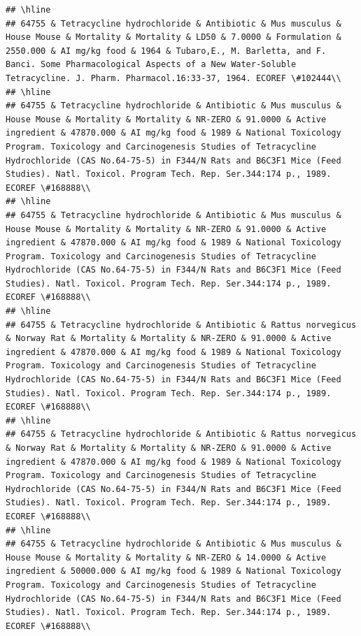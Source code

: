 \documentclass[12pt,]{article}
\begin{document}
\begin{verbatim}
## \hline
## 64755 & Tetracycline hydrochloride & Antibiotic & Mus musculus & House Mouse & Mortality & Mortality & LD50 & 7.0000 & Formulation & 2550.000 & AI mg/kg food & 1964 & Tubaro,E., M. Barletta, and F. Banci. Some Pharmacological Aspects of a New Water-Soluble Tetracycline. J. Pharm. Pharmacol.16:33-37, 1964. ECOREF \#102444\\
## \hline
## 64755 & Tetracycline hydrochloride & Antibiotic & Mus musculus & House Mouse & Mortality & Mortality & NR-ZERO & 91.0000 & Active ingredient & 47870.000 & AI mg/kg food & 1989 & National Toxicology Program. Toxicology and Carcinogenesis Studies of Tetracycline Hydrochloride (CAS No.64-75-5) in F344/N Rats and B6C3F1 Mice (Feed Studies). Natl. Toxicol. Program Tech. Rep. Ser.344:174 p., 1989. ECOREF \#168888\\
## \hline
## 64755 & Tetracycline hydrochloride & Antibiotic & Mus musculus & House Mouse & Mortality & Mortality & NR-ZERO & 91.0000 & Active ingredient & 47870.000 & AI mg/kg food & 1989 & National Toxicology Program. Toxicology and Carcinogenesis Studies of Tetracycline Hydrochloride (CAS No.64-75-5) in F344/N Rats and B6C3F1 Mice (Feed Studies). Natl. Toxicol. Program Tech. Rep. Ser.344:174 p., 1989. ECOREF \#168888\\
## \hline
## 64755 & Tetracycline hydrochloride & Antibiotic & Rattus norvegicus & Norway Rat & Mortality & Mortality & NR-ZERO & 91.0000 & Active ingredient & 47870.000 & AI mg/kg food & 1989 & National Toxicology Program. Toxicology and Carcinogenesis Studies of Tetracycline Hydrochloride (CAS No.64-75-5) in F344/N Rats and B6C3F1 Mice (Feed Studies). Natl. Toxicol. Program Tech. Rep. Ser.344:174 p., 1989. ECOREF \#168888\\
## \hline
## 64755 & Tetracycline hydrochloride & Antibiotic & Rattus norvegicus & Norway Rat & Mortality & Mortality & NR-ZERO & 91.0000 & Active ingredient & 47870.000 & AI mg/kg food & 1989 & National Toxicology Program. Toxicology and Carcinogenesis Studies of Tetracycline Hydrochloride (CAS No.64-75-5) in F344/N Rats and B6C3F1 Mice (Feed Studies). Natl. Toxicol. Program Tech. Rep. Ser.344:174 p., 1989. ECOREF \#168888\\
## \hline
## 64755 & Tetracycline hydrochloride & Antibiotic & Mus musculus & House Mouse & Mortality & Mortality & NR-ZERO & 14.0000 & Active ingredient & 50000.000 & AI mg/kg food & 1989 & National Toxicology Program. Toxicology and Carcinogenesis Studies of Tetracycline Hydrochloride (CAS No.64-75-5) in F344/N Rats and B6C3F1 Mice (Feed Studies). Natl. Toxicol. Program Tech. Rep. Ser.344:174 p., 1989. ECOREF \#168888\\

\end{verbatim}
\end{document}
